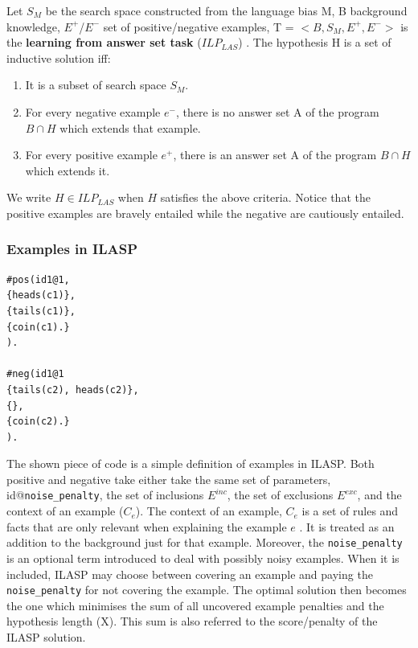 Let $S_M$ be the search space constructed from the language bias M, B background knowledge, $E^+$/$E^-$ set of positive/negative examples, T = $<B, S_M, E^+, E^->$ is the \textbf{learning from answer set task} ($ILP_{LAS}$) \cite{RefWorks:RefID:47-law2014inductive}.
The hypothesis H is a set of inductive solution iff:
\begin{enumerate}
    \item It is a subset of search space $S_M$.
    \item For every negative example $e^-$, there is no answer set A of the program $B \cap H$ which extends that example.
    \item For every positive example $e^+$, there is an answer set A of the program $B \cap H$ which extends it.
\end{enumerate}

We write $H \in ILP_{LAS}$ when $H$ satisfies the above criteria.
Notice that the positive examples are bravely entailed while the negative are cautiously entailed.

\subsubsection{Examples in ILASP}
\label{examples-in-ilasp}

\begin{verbatim}
#pos(id1@1,
{heads(c1)},
{tails(c1)},
{coin(c1).}
).

#neg(id1@1
{tails(c2), heads(c2)},
{},
{coin(c2).}
).
\end{verbatim}

The shown piece of code is a simple definition of examples in ILASP. 
Both positive and negative take either take the same set of parameters, id@\verb+noise_penalty+, the set of inclusions $E^{inc}$, the set of exclusions $E^{exc}$, and the context of an example ($C_e$).
The context of an example, $C_e$ is a set of rules and facts that are only relevant when explaining the example $e$ \cite{RefWorks:RefID:56-broda2016iterative}.
It is treated as an addition to the background just for that example.
Moreover, the \verb+noise_penalty+ is an optional term introduced to deal with possibly noisy examples. 
When it is included, ILASP may choose between covering an example and paying the \verb+noise_penalty+ for not covering the example.
The optimal solution then becomes the one which minimises the sum of all uncovered example penalties and the hypothesis length (X).
This sum is also referred to the score/penalty of the ILASP solution.


